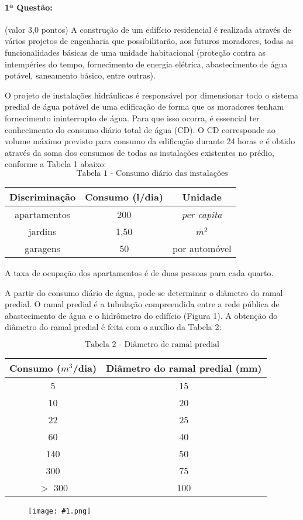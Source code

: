 \documentclass[12pt,a4paper]{article}
\newcommand{\imgh}[2]{\begin{figure}[h]
\centering
\texttt{[image: \#1.png]}
\end{figure}}
\begin{document}
\paragraph{1ª Questão:} (valor 3,0 pontos) A construção de um edifício residencial é realizada através de vários projetos de engenharia que possibilitarão, aos futuros moradores, todas as funcionalidades básicas de uma unidade habitacional (proteção contra as intempéries do tempo, fornecimento de energia elétrica,
abastecimento de água potável, saneamento básico, entre outras).

O projeto de instalações hidráulicas é responsável por dimensionar todo o sistema predial de água potável de uma edificação de forma que os moradores tenham fornecimento ininterrupto de água. Para
que isso ocorra, é essencial ter conhecimento do consumo diário total de água (CD). O CD corresponde ao volume máximo previsto para consumo da edificação durante 24 horas e é obtido através da soma dos consumos de todas as instalações existentes no prédio, conforme a Tabela 1 abaixo:
$$\text{Tabela 1 - Consumo diário das instalações}$$
\noindent 
\begin{center}
\begin{tabular}{ |c|c|c| } \hline
\textbf{Discriminação} &  \textbf{Consumo (l/dia)} &\textbf{Unidade}\\ \hline
apartamentos & 200 & \textit{per capita}\\ \hline jardins & 1,50 & $m^2$ \\ \hline garagens & 50 & por automóvel \\ \hline
\end{tabular}
\end{center}
\normalsize

\vspace{3mm}

A taxa de ocupação dos apartamentos é de duas pessoas para cada quarto.

A partir do consumo diário de água, pode-se determinar o diâmetro do ramal predial. O ramal
predial é a tubulação compreendida entre a rede pública de abastecimento de água e o hidrômetro do
edifício (Figura 1). A obtenção do diâmetro do ramal predial é feita com o auxílio da Tabela 2:

$$\text{Tabela 2 - Diâmetro de ramal predial}$$
\noindent 
\begin{center}
\begin{tabular}{ |c|c| } \hline
\textbf{Consumo ($m^3$/dia)} &  \textbf{Diâmetro do ramal predial (mm)} \\ \hline
5 & 15 \\ \hline
10 & 20 \\ \hline
22 & 25 \\ \hline
60 & 40 \\ \hline
140 & 50 \\ \hline
300 & 75 \\ \hline
$>$ 300 & 100 \\ \hline
\end{tabular}
\end{center}
\imgh{icvc2014q1}{8}
\end{document}
